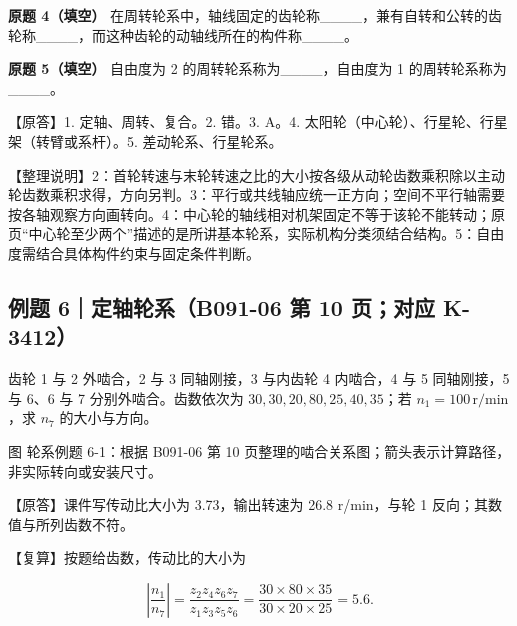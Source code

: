\documentclass[zihao=5,a4paper,UTF8,fontset=fandol]{ctexart}
\begin{document}
\textbf{原题 4（填空）} 在周转轮系中，轴线固定的齿轮称\_\_\_\_，兼有自转和公转的齿轮称\_\_\_\_，而这种齿轮的动轴线所在的构件称\_\_\_\_。


\textbf{原题 5（填空）} 自由度为 2 的周转轮系称为\_\_\_\_，自由度为 1 的周转轮系称为\_\_\_\_。


【原答】1. 定轴、周转、复合。2. 错。3. A。4. 太阳轮（中心轮）、行星轮、行星架（转臂或系杆）。5. 差动轮系、行星轮系。


【整理说明】2：首轮转速与末轮转速之比的大小按各级从动轮齿数乘积除以主动轮齿数乘积求得，方向另判。3：平行或共线轴应统一正方向；空间不平行轴需要按各轴观察方向画转向。4：中心轮的轴线相对机架固定不等于该轮不能转动；原页“中心轮至少两个”描述的是所讲基本轮系，实际机构分类须结合结构。5：自由度需结合具体构件约束与固定条件判断。




\subsection{例题 6｜定轴轮系（B091-06 第 10 页；对应 K-3412）}

齿轮 1 与 2 外啮合，2 与 3 同轴刚接，3 与内齿轮 4 内啮合，4 与 5 同轴刚接，5 与 6、6 与 7 分别外啮合。齿数依次为 $30,30,20,80,25,40,35$；若 $n_1=100\,\mathrm{r/min}$，求 $n_7$ 的大小与方向。


\begin{center}
\end{center}


图 轮系例题 6-1：根据 B091-06 第 10 页整理的啮合关系图；箭头表示计算路径，非实际转向或安装尺寸。


【原答】课件写传动比大小为 3.73，输出转速为 26.8 r/min，与轮 1 反向；其数值与所列齿数不符。


【复算】按题给齿数，传动比的大小为


\[\left|\frac{n_1}{n_7}\right|=\frac{z_2z_4z_6z_7}{z_1z_3z_5z_6}=\frac{30\times80\times35}{30\times20\times25}=5.6.\]
\end{document}
